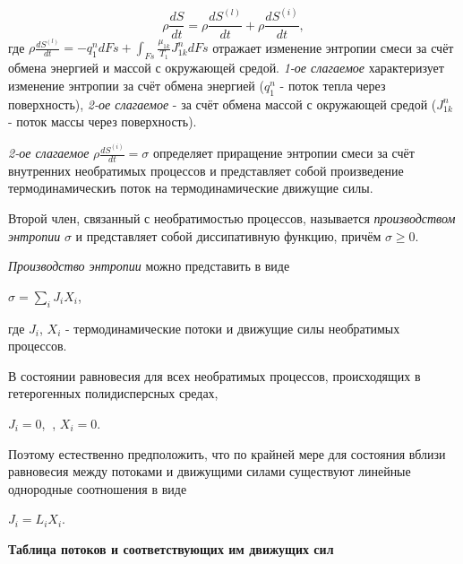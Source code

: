 \documentclass[12pt, a4paper]{report}
\begin{document}
	\begin{equation}
		\rho \frac{dS}{dt} = \rho \frac{dS^{(l)}}{dt} + \rho \frac{dS^{(i)}}{dt},
	\end{equation}
	где $\rho \frac{dS^{(l)}}{dt} = -q_{1}^{n} dFs + \int_{Fs} \frac{\mu_{1k}}{T_{1}} J_{1k}^{n} dFs$ отражает изменение энтропии смеси за счёт обмена энергией и массой с окружающей средой. \textit{1-ое слагаемое} характеризует изменение энтропии за счёт обмена энергией ($q_{1}^{n}$ - поток тепла через поверхность), \textit{2-ое слагаемое} - за счёт обмена массой с окружающей средой ($J_{1k}^{n}$ - поток массы через поверхность). \par
	\textit{2-ое слагаемое} $\rho \frac{dS^{(i)}}{dt} = \sigma$ определяет приращение энтропии смеси за счёт внутренних необратимых процессов и представляет собой произведение термодинамическиъ поток на термодинамические движущие силы. \par
	Второй член, связанный с необратимостью процессов, называется \textit{производством} \textit{энтропии} $\sigma$ и представляет собой диссипативную функцию, причём $\sigma \ge 0$. \par
	\textit{Производство энтропии} можно представить в виде
	\begin{center}
		$\sigma = \sum_{i} J_{i} X_{i}$,
	\end{center}
	где $J_{i}$, $X_{i}$ - термодинамические потоки и движущие силы необратимых процессов. \par
	В состоянии равновесия для всех необратимых процессов, происходящих в гетерогенных полидисперсных средах,
	\begin{center}
		$J_{i} = 0$, $\>$, $X_{i} = 0$.
	\end{center}
	Поэтому естественно предположить, что по крайней мере для состояния вблизи равновесия между потоками и движущими силами существуют линейные однородные соотношения в виде
	\begin{center}
		$J_{i} = L_{i} X_{i}$.
	\end{center}
	\begin{center}
		\textbf{Таблица потоков и соответствующих им движущих сил}
	\end{center}
\end{document}
